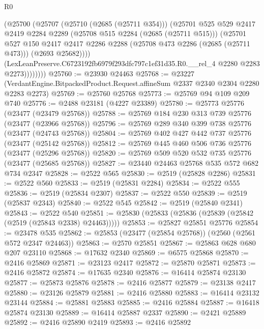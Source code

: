 \begin{lexlean}{R0}
\begin{coremodule}
                (@25700
                  (@25707
                    (@25710 (@2685 (@25711 @354)))
                    (@25701
                      @525
                      @529
                      @2417
                      @2419
                      @2284
                      @2289
                      (@25708 @515 @2284 (@2685 (@25711 @515)))
                      (@25701
                        @527
                        @150
                        @2417
                        @2417
                        @2286
                        @2288
                        (@25708 @473 @2286 (@2685 (@25711 @473)))
                        (@2693 @25682))))
                  (LexLeanPreserve.C6723192fb6979f293dfc797c1ef31d35.R0.__rel_4
                    @2280
                    @2283
                    @2273))))))))
@25760 := @23930 @24463
@25768 := @23227
    (VerdantEngine.BitpackedProduct.Request.affineSum @2337 @2340 @2304 @2280 @2283 @2273)
@25769 := @25760 @25768
@25773 := @25769 @94 @109 @209 @740
@25776 := @2488 @23181 (@4227 @23389)
@25780 := @25773 @25776 (@23477 (@23479 @25768))
@25788 := @25769 @184 @230 @313 @739 @25776 (@23477 (@23966 @25768))
@25796 := @25769 @289 @340 @399 @738 @25776 (@23477 (@24743 @25768))
@25804 := @25769 @402 @427 @442 @737 @25776 (@23477 (@25142 @25768))
@25812 := @25769 @445 @460 @506 @736 @25776 (@23477 (@25296 @25768))
@25820 := @25769 @509 @520 @532 @735 @25776 (@23477 (@25685 @25768))
@25827 := @23440 @24463 @25768 @535 @572 @682 @734 @2347
@25828 := @2522 @565
@25830 := @2519 (@25828 @2286)
@25831 := @2522 @560
@25833 := @2519 (@25831 @2284)
@25834 := @2522 @555
@25836 := @2519 (@25834 @2307)
@25837 := @2522 @550
@25839 := @2519 (@25837 @2343)
@25840 := @2522 @545
@25842 := @2519 (@25840 @2341)
@25843 := @2522 @540
@25851 := @25830 (@25833 (@25836 (@25839 (@25842 (@2519 (@25843 @2338) @24463)))))
@25853 := @25827 @25851 @25776
@25854 := @23478 @535
@25862 := @25853 (@23477 (@25854 @25768)) (@2560 (@2561 @572 @2347 @24463))
@25863 := @2570 @25851
@25867 := @25863 @628 @680 @207 @23110
@25868 := @17632 @2340
@25869 := @6575 @25868
@25870 := @2416 @25869
@25871 := @23123 @2417
@25872 := @25870 @25871
@25873 := @2416 @25872
@25874 := @17635 @2340
@25876 := @16414 @25874 @23130
@25877 := @25873 @25876
@25878 := @2416 @25877
@25879 := @23138 @2417
@25880 := @23126 @25879
@25881 := @2416 @25880
@25883 := @16414 @23132 @23144
@25884 := @25881 @25883
@25885 := @2416 @25884
@25887 := @16418 @25874 @23130
@25889 := @16414 @25887 @2337
@25890 := @2421 @25889
@25892 := @2416 @25890 @2419
@25893 := @2416 @25892

\end{coremodule}
\end{lexlean}
